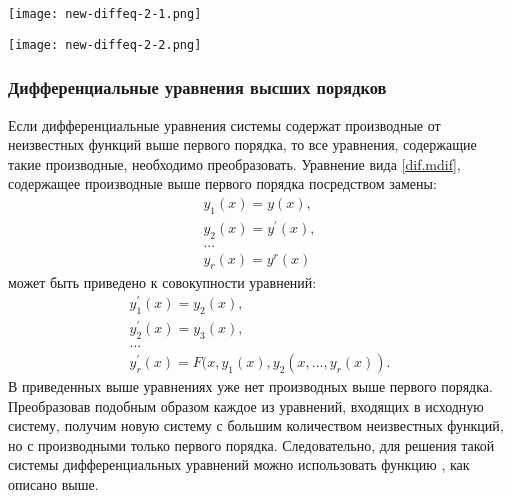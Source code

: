 
\begin{center}
	\texttt{[image: new-diffeq-2-1.png]}
\end{center}

\begin{center}
	\texttt{[image: new-diffeq-2-2.png]}
\end{center}

\subsubsection{Дифференциальные уравнения высших порядков}
Если дифференциальные уравнения системы содержат производные от неизвестных функций выше первого порядка, то все уравнения, содержащие такие производные, необходимо преобразовать. Уравнение вида \ref{dif.mdif}, содержащее производные выше первого порядка посредством замены:
\begin{equation}
\begin{gathered}
y_1(x)=y(x),\\ y_2(x)=y^{\prime}(x),\\  ... \\ y_r(x)=y^r(x)
\end{gathered}
\end{equation}
может быть приведено к совокупности уравнений:
\begin{equation}
\begin{gathered}
y_1^{\prime}(x)=y_2(x), \\ y_2^{\prime}(x)=y_3(x), \\ ... \\ y_r^{\prime}(x)=F(x,y_1(x),y_2(x, ... , y_r(x)).
\end{gathered}
\end{equation}
В приведенных выше уравнениях уже нет производных выше первого порядка. Преобразовав подобным образом каждое из уравнений, входящих в исходную систему, получим новую систему с большим количеством неизвестных функций, но с производными только первого порядка. Следовательно, для решения такой системы дифференциальных уравнений можно использовать функцию , как описано выше.


